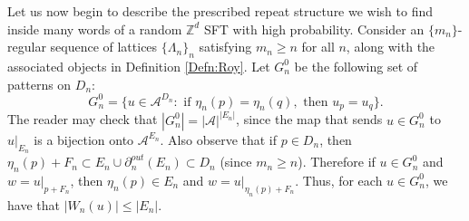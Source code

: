 \documentclass[12pt]{amsart}
\newtheorem{lemma}[theorem]{Lemma}
\theoremstyle{definition}
\newtheorem{remark}[theorem]{Remark}
\def\N{\mathbb{N}}
\def\Z{\mathbb{Z}}
\begin{document}



Let us now begin to describe the prescribed repeat structure we wish to find inside many words of a random $\mathbb{Z}^d$ SFT with high probability. %
Consider an $\{m_n\}$-regular sequence of lattices $\{\Lambda_n\}_n$ satisfying $m_n \geq n$ for all $n$, along with the associated objects in Definition \ref{Defn:Roy}.
Let $G_n^0$ be the following set of patterns on $D_n$:
\begin{equation*}
G_n^0 = \bigl\{ u \in \mathcal{A}^{D_n} : \text{ if } \eta_n(p)  = \eta_n(q), \text{ then } u_p = u_q \bigr\}.
\end{equation*}
The reader may check that $|G_n^0| = |\mathcal{A}|^{|E_n|}$, since the map that sends $u \in G_n^0$ to $u|_{E_n}$ is a bijection onto $\mathcal{A}^{E_n}$.
Also observe that if $p \in D_n$, then $\eta_n(p) + F_n \subset E_n \cup  \partial^{out}_{n}(E_n) \subset D_n$ (since $m_n \geq n$). Therefore if $u \in G_n^0$ and $w = u|_{p+F_n}$, then $\eta_n(p) \in E_n$ and $w = u|_{\eta_n(p) +F_n}$. Thus, for each $u \in G_n^0$, we have that $|W_n(u)| \leq |E_n|$.

%
\end{document}
